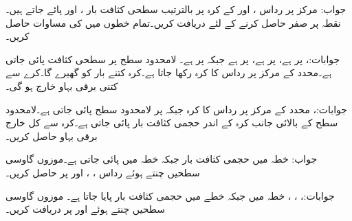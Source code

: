 جواب:
مرکز پر رداس ،  اور  کے کرہ پر بالترتیب سطحی کثافت بار ، 
 اور  پائے جاتے ہیں۔نقطہ  پر صفر  حاصل کرنے کے لئے  دریافت کریں۔تمام خطوں میں  کی مساوات حاصل کریں۔  

جوابات:،  پر  ہے،  پر  ہے، پر  ہے جبکہ  پر  ہے۔
لامحدود سطح  پر  سطحی کثافت پائی جاتی ہے۔محدد کے مرکز پر  رداس کا کرہ رکھا جاتا ہے۔کرہ کتنے بار کو گھیرے گا۔کرے سے کتنی برقی بہاو خارج ہو گی۔

جوابات:، 
محدد کے مرکز پر  رداس کا کرہ جبکہ  پر لامحدود سطح پائی جاتی ہے۔لامحدود سطح کے بالائی جانب کرہ کے اندر  حجمی کثافت
 بار  پائی جاتی ہے۔کرہ سے کل خارج برقی بہاو حاصل کریں۔

جواب: 
خطہ  میں حجمی کثافت بار  جبکہ
 خطہ  میں  پائی جاتی ہے۔موزوں گاوسی سطحیں چنتے ہوئے رداس ، ،  اور  پر  حاصل کریں۔

جوابات:، ، ، 
خطہ  میں  جبکہ  خطے میں  حجمی کثافت بار پایا جاتا ہے۔ موزوں گاوسی سطحیں چنتے
 ہوئے   اور  پر  دریافت کریں۔

